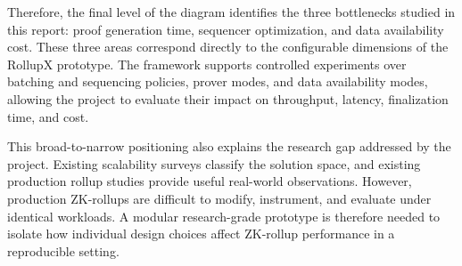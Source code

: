 Therefore, the final level of the diagram identifies the three bottlenecks studied in this report: proof generation time, sequencer optimization, and data availability cost. These three areas correspond directly to the configurable dimensions of the RollupX prototype. The framework supports controlled experiments over batching and sequencing policies, prover modes, and data availability modes, allowing the project to evaluate their impact on throughput, latency, finalization time, and cost.

This broad-to-narrow positioning also explains the research gap addressed by the project. Existing scalability surveys classify the solution space, and existing production rollup studies provide useful real-world observations. However, production ZK-rollups are difficult to modify, instrument, and evaluate under identical workloads. A modular research-grade prototype is therefore needed to isolate how individual design choices affect ZK-rollup performance in a reproducible setting.

